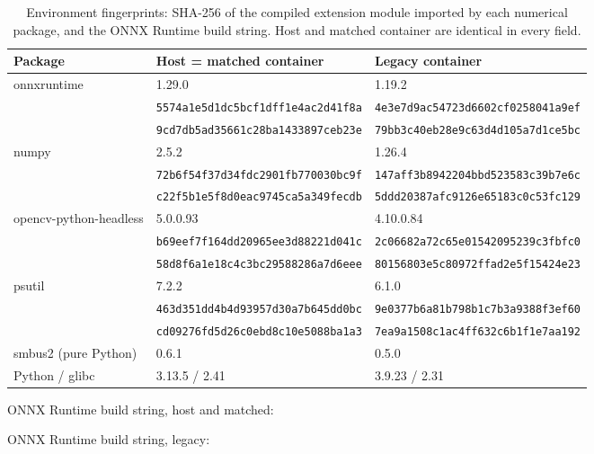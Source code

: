 \begin{table}[!htbp]\centering\scriptsize
\caption{Environment fingerprints: SHA-256 of the compiled extension module imported by each numerical package, and the ONNX Runtime build string. Host and matched container are identical in every field.}
\label{tab:s-fp}
\begin{tabular}{lll}\toprule Package & Host = matched container & Legacy container\\\midrule
onnxruntime & 1.29.0 & 1.19.2\\
 & \texttt{5574a1e5d1dc5bcf1dff1e4ac2d41f8a} & \texttt{4e3e7d9ac54723d6602cf0258041a9ef}\\
 & \texttt{9cd7db5ad35661c28ba1433897ceb23e} & \texttt{79bb3c40eb28e9c63d4d105a7d1ce5bc}\\
numpy & 2.5.2 & 1.26.4\\
 & \texttt{72b6f54f37d34fdc2901fb770030bc9f} & \texttt{147aff3b8942204bbd523583c39b7e6c}\\
 & \texttt{c22f5b1e5f8d0eac9745ca5a349fecdb} & \texttt{5ddd20387afc9126e65183c0c53fc129}\\
opencv-python-headless & 5.0.0.93 & 4.10.0.84\\
 & \texttt{b69eef7f164dd20965ee3d88221d041c} & \texttt{2c06682a72c65e01542095239c3fbfc0}\\
 & \texttt{58d8f6a1e18c4c3bc29588286a7d6eee} & \texttt{80156803e5c80972ffad2e5f15424e23}\\
psutil & 7.2.2 & 6.1.0\\
 & \texttt{463d351dd4b4d93957d30a7b645dd0bc} & \texttt{9e0377b6a81b798b1c7b3a9388f3ef60}\\
 & \texttt{cd09276fd5d26c0ebd8c10e5088ba1a3} & \texttt{7ea9a1508c1ac4ff632c6b1f1e7aa192}\\
smbus2 (pure Python) & 0.6.1 & 0.5.0\\
Python / glibc & 3.13.5 / 2.41 & 3.9.23 / 2.31\\
\bottomrule\end{tabular}
\par\medskip\raggedright\scriptsize ONNX Runtime build string, host and matched: \par
ONNX Runtime build string, legacy: \par
\end{table}
